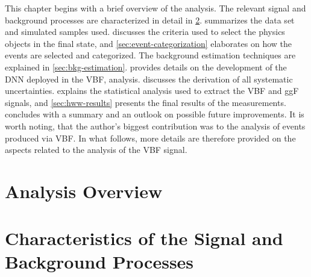 This chapter begins with a brief overview of the analysis.
The relevant signal and background processes are characterized in detail in \cref{sec:signal-bkg-characteristics}. 
 summarizes the data set and simulated samples used.
 discusses the criteria used to select the physics objects in the final state, and \cref{sec:event-categorization} elaborates on how the events are selected and categorized. 
The background estimation techniques are explained in \cref{sec:bkg-estimation}. 
 provides details on the development of the DNN deployed in the VBF, \HWW analysis. 
 discusses the derivation of all systematic uncertainties. 
 explains the statistical analysis used to extract the VBF and ggF signals, and \cref{sec:hww-results} presents the final results of the measurements.
 concludes with a summary and an outlook on possible future improvements.
It is worth noting, that the author's biggest contribution was to the analysis of \HWW events produced via VBF. In what follows, more details are therefore provided on the aspects related to the analysis of the VBF signal.



\section{Analysis Overview}
\label{sec:analysis-overview}


\section{Characteristics of the Signal and Background Processes}
\label{sec:signal-bkg-characteristics}



